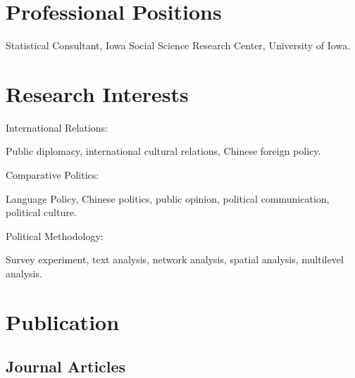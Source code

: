 \documentclass[10.5pt,]{article}
\providecommand{\tightlist}{%
  \setlength{\itemsep}{0pt}\setlength{\parskip}{0pt}}
\renewenvironment{itemize}{
  \begin{list}{}{
    \setlength{\leftmargin}{1.5em}
  }
}{
  \end{list}
}
\begin{document}
\section{Professional Positions}\label{professional-positions}

\begin{itemize}
\tightlist
\item
  Statistical Consultant, Iowa Social Science Research Center,
  University of Iowa.
\end{itemize}

\section{Research Interests}\label{research-interests}

\begin{itemize}
\tightlist
\item
  International Relations:

  \begin{itemize}
  \tightlist
  \item
    Public diplomacy, international cultural relations, Chinese foreign
    policy.
  \end{itemize}
\item
  Comparative Politics:

  \begin{itemize}
  \tightlist
  \item
    Language Policy, Chinese politics, public opinion, political
    communication, political culture.
  \end{itemize}
\item
  Political Methodology:

  \begin{itemize}
  \tightlist
  \item
    Survey experiment, text analysis, network analysis, spatial
    analysis, multilevel analysis.
  \end{itemize}
\end{itemize}

\section{Publication}\label{publication}

\subsection{Journal Articles}\label{journal-articles}
\end{document}
